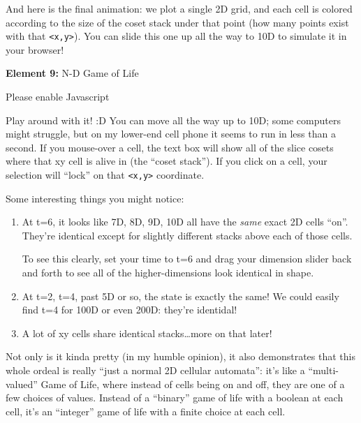 \documentclass[]{article}
\begin{document}
And here is the final animation: we plot a single 2D grid, and each cell is
colored according to the size of the coset stack under that point (how many
points exist with that \texttt{\textless{}x,y\textgreater{}}). You can slide
this one up all the way to 10D to simulate it in your browser!

\leavevmode\hypertarget{golFlat}{}%
\textbf{Element 9:} N-D Game of Life

\leavevmode\hypertarget{golFlatCont}{}%
Please enable Javascript

Play around with it! :D You can move all the way up to 10D; some computers might
struggle, but on my lower-end cell phone it seems to run in less than a second.
If you mouse-over a cell, the text box will show all of the slice cosets where
that xy cell is alive in (the ``coset stack''). If you click on a cell, your
selection will ``lock'' on that \texttt{\textless{}x,y\textgreater{}}
coordinate.

Some interesting things you might notice:

\begin{enumerate}
\def\labelenumi{\arabic{enumi}.}
\item
  At t=6, it looks like 7D, 8D, 9D, 10D all have the \emph{same} exact 2D cells
  ``on''. They're identical except for slightly different stacks above each of
  those cells.

  To see this clearly, set your time to t=6 and drag your dimension slider back
  and forth to see all of the higher-dimensions look identical in shape.
\item
  At t=2, t=4, past 5D or so, the state is exactly the same! We could easily
  find t=4 for 100D or even 200D: they're identidal!
\item
  A lot of xy cells share identical stacks\ldots more on that later!
\end{enumerate}

Not only is it kinda pretty (in my humble opinion), it also demonstrates that
this whole ordeal is really ``just a normal 2D cellular automata'': it's like a
``multi-valued'' Game of Life, where instead of cells being on and off, they are
one of a few choices of values. Instead of a ``binary'' game of life with a
boolean at each cell, it's an ``integer'' game of life with a finite choice at
each cell.
\end{document}
